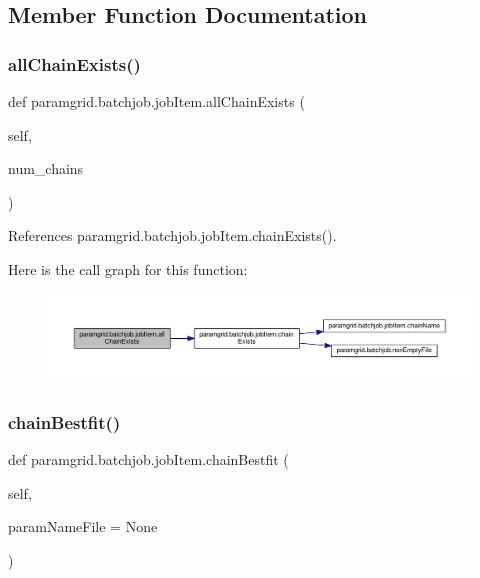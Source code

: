 \subsection{Member Function Documentation}
\mbox{\label{classparamgrid_1_1batchjob_1_1jobItem_a2aebd345765a90efdbcb15062b09e5ac}} 
\subsubsection{\texorpdfstring{all\+Chain\+Exists()}{allChainExists()}}
{\footnotesize\ttfamily def paramgrid.\+batchjob.\+job\+Item.\+all\+Chain\+Exists (\begin{DoxyParamCaption}\item[{}]{self,  }\item[{}]{num\+\_\+chains }\end{DoxyParamCaption})}



References paramgrid.\+batchjob.\+job\+Item.\+chain\+Exists().

Here is the call graph for this function\+:
\nopagebreak
\begin{figure}[H]
\begin{center}
\leavevmode
\includegraphics[width=350pt]{classparamgrid_1_1batchjob_1_1jobItem_a2aebd345765a90efdbcb15062b09e5ac_cgraph}
\end{center}
\end{figure}
\mbox{\label{classparamgrid_1_1batchjob_1_1jobItem_a58c7ab8e50b105e645388b81d0e26f5a}} 
\subsubsection{\texorpdfstring{chain\+Bestfit()}{chainBestfit()}}
{\footnotesize\ttfamily def paramgrid.\+batchjob.\+job\+Item.\+chain\+Bestfit (\begin{DoxyParamCaption}\item[{}]{self,  }\item[{}]{param\+Name\+File = {\ttfamily None} }\end{DoxyParamCaption})}



